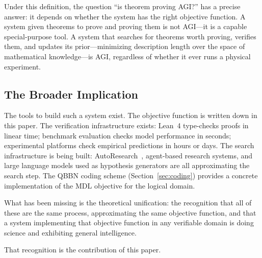 Under this definition, the question ``is theorem proving AGI?'' has a
precise answer: it depends on whether the system has the right
objective function. A system given theorems to prove and proving them
is not AGI---it is a capable special-purpose tool. A system that
searches for theorems worth proving, verifies them, and updates its
prior---minimizing description length over the space of mathematical
knowledge---is AGI, regardless of whether it ever runs a physical
experiment.

\subsection{The Broader Implication}

The tools to build such a system exist. The objective function is
written down in this paper. The verification infrastructure exists:
Lean~4 type-checks proofs in linear time; benchmark evaluation checks
model performance in seconds; experimental platforms check empirical
predictions in hours or days. The search infrastructure is being built:
AutoResearch~\cite{karpathy2026}, agent-based research systems, and
large language models used as hypothesis generators are all
approximating the search step. The QBBN coding scheme
(Section~\ref{sec:coding}) provides a concrete implementation of the
MDL objective for the logical domain.

What has been missing is the theoretical unification: the recognition
that all of these are the same process, approximating the same
objective function, and that a system implementing that objective
function in any verifiable domain is doing science and exhibiting
general intelligence.

That recognition is the contribution of this paper.